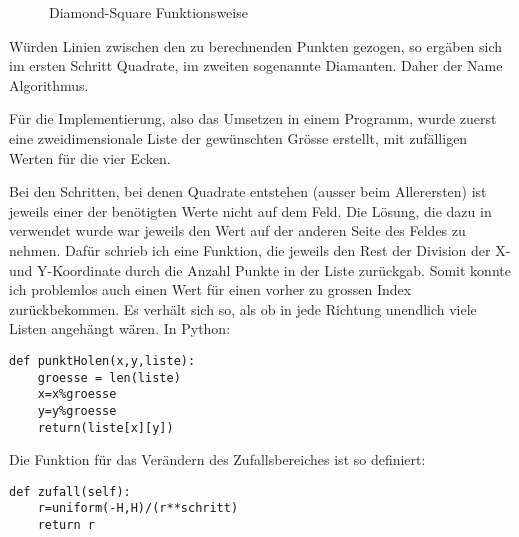 \documentclass[12pt,twoside]{book}
\begin{document}
\begin{figure}[H]

\hspace{0.3cm}
\hspace{0.3cm}
\hspace{0.3cm}
\hspace{0.3cm}

\caption{Diamond-Square Funktionsweise}
\centering
\label{DSFunktionsweise}
\end{figure}

W\"urden Linien zwischen den zu berechnenden Punkten gezogen, so erg\"aben sich im ersten Schritt Quadrate, im zweiten sogenannte Diamanten. Daher der Name Algorithmus.

F\"ur die Implementierung, also das Umsetzen in einem Programm, wurde zuerst eine zweidimensionale Liste der gew\"unschten Gr\"osse erstellt, mit zuf\"alligen Werten f\"ur die vier Ecken.

Bei den Schritten, bei denen Quadrate entstehen (ausser beim Allerersten) ist jeweils einer der ben\"otigten Werte nicht auf dem Feld. Die L\"osung, die dazu in \cite{DSC} verwendet wurde war  jeweils den Wert auf der anderen Seite des Feldes zu nehmen. Daf\"ur schrieb ich eine Funktion, die jeweils den Rest der Division der X- und Y-Koordinate durch die Anzahl Punkte in der Liste zur\"uckgab. Somit konnte ich problemlos auch einen Wert f\"ur einen vorher zu grossen Index zur\"uckbekommen. Es verh\"alt sich so, als ob in jede Richtung unendlich viele Listen angeh\"angt w\"aren.
In Python:

\begin{lstlisting}
def punktHolen(x,y,liste):
    groesse = len(liste)
    x=x%groesse
    y=y%groesse
    return(liste[x][y])
\end{lstlisting}

Die Funktion f\"ur das Ver\"andern des Zufallsbereiches ist so definiert:

\begin{lstlisting}
def zufall(self):
    r=uniform(-H,H)/(r**schritt)
    return r
\end{lstlisting}
\end{document}
